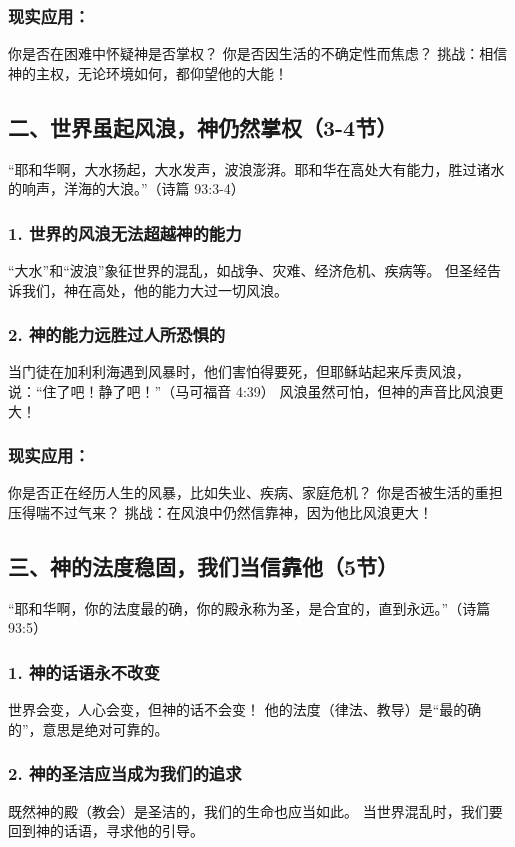 \documentclass[a4paper, 12pt]{article}
\begin{document}
\subsubsection*{现实应用：}

你是否在困难中怀疑神是否掌权？
你是否因生活的不确定性而焦虑？
挑战：相信神的主权，无论环境如何，都仰望他的大能！

\subsection*{二、世界虽起风浪，神仍然掌权（3-4节）}
“耶和华啊，大水扬起，大水发声，波浪澎湃。耶和华在高处大有能力，胜过诸水的响声，洋海的大浪。”（诗篇 93:3-4）

\subsubsection*{1. 世界的风浪无法超越神的能力}
“大水”和“波浪”象征世界的混乱，如战争、灾难、经济危机、疾病等。
但圣经告诉我们，神在高处，他的能力大过一切风浪。
\subsubsection*{2. 神的能力远胜过人所恐惧的}
当门徒在加利利海遇到风暴时，他们害怕得要死，但耶稣站起来斥责风浪，说：“住了吧！静了吧！”（马可福音 4:39）
风浪虽然可怕，但神的声音比风浪更大！
\subsubsection*{现实应用：}

你是否正在经历人生的风暴，比如失业、疾病、家庭危机？
你是否被生活的重担压得喘不过气来？
挑战：在风浪中仍然信靠神，因为他比风浪更大！

\subsection*{三、神的法度稳固，我们当信靠他（5节）}
“耶和华啊，你的法度最的确，你的殿永称为圣，是合宜的，直到永远。”（诗篇 93:5）

\subsubsection*{1. 神的话语永不改变}
世界会变，人心会变，但神的话不会变！
他的法度（律法、教导）是“最的确的”，意思是绝对可靠的。
\subsubsection*{2. 神的圣洁应当成为我们的追求}
既然神的殿（教会）是圣洁的，我们的生命也应当如此。
当世界混乱时，我们要回到神的话语，寻求他的引导。
\end{document}
